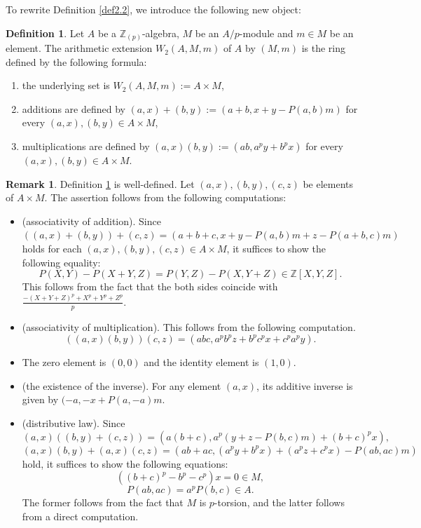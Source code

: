 \documentclass[11pt, a4paper]{amsart}
\theoremstyle{plain}
\theoremstyle{definition}
\newtheorem{definition}[theorem]{Definition}
\newtheorem{remark}[theorem]{Remark}
\begin{document}
To rewrite Definition \ref{def2.2}, we introduce the following new object:
\begin{definition}\label{def2.4}
    Let $A$ be a $\mathbb Z_{(p)}$-algebra, $M$ be an $A/p$-module and $m\in M$ be an element. The arithmetic extension $W_2(A,M,m)$ of $A$ by $(M,m)$ is the ring defined by the following formula:\begin{enumerate}
        \item the underlying set is $W_2(A,M,m):=A\times M$,
        \item additions are defined by $(a,x)+(b,y):=(a+b,x+y-P(a,b)m)$ for every $(a,x), (b,y)\in A\times M$,
        \item multiplications are defined by $(a,x)(b,y):=(ab,a^py+b^px)$ for every $(a,x), (b,y)\in A\times M$.
    \end{enumerate}
\end{definition}

\begin{remark}
    Definition \ref{def2.4} is well-defined. Let $(a,x), (b,y), (c,z)$ be elements of $A\times M$. The assertion follows from the following computations:
    \begin{itemize}
        \item (associativity of addition). Since $((a,x)+(b,y))+(c,z)=(a+b+c,x+y-P(a,b)m+z-P(a+b,c)m)$ holds for each $(a,x), (b,y), (c,z)\in A\times M$, it suffices to show the following equality:\[P(X,Y)-P(X+Y,Z)=P(Y,Z)-P(X,Y+Z)\in \mathbb Z[X,Y,Z].\] This follows from the fact that the both sides coincide with $\frac{-(X+Y+Z)^p+X^p+Y^p+Z^p}{p}$.
        \item (associativity of multiplication). This follows from the following computation. \[((a,x)(b,y))(c,z)=(abc,a^pb^pz+b^pc^px+c^pa^py).\]
        \item The zero element is $(0,0)$ and the identity element is $(1,0)$.
        \item (the existence of the inverse). For any element $(a,x)$, its additive inverse is given by $(-a,-x+P(a,-a)m$.
        \item (distributive law). Since
        \[(a,x)((b,y)+(c,z))=(a(b+c),a^p(y+z-P(b,c)m)+(b+c)^px),\]
        \[(a,x)(b,y)+(a,x)(c,z)=(ab+ac,(a^py+b^px)+(a^pz+c^px)-P(ab,ac)m)\] hold, it suffices to show the following equations:\[((b+c)^p-b^p-c^p)x=0\in M,\] \[P(ab,ac)=a^pP(b,c)\in A.\] The former follows from the fact that $M$ is $p$-torsion, and the latter follows from a direct computation.
    \end{itemize}
\end{remark}\label{lem2.5}
    
\end{document}
